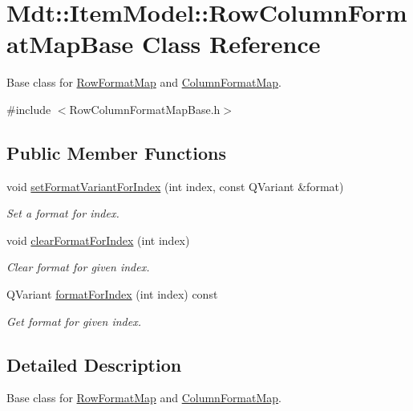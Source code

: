 \hypertarget{class_mdt_1_1_item_model_1_1_row_column_format_map_base}{}\section{Mdt\+:\+:Item\+Model\+:\+:Row\+Column\+Format\+Map\+Base Class Reference}
\label{class_mdt_1_1_item_model_1_1_row_column_format_map_base}


Base class for \hyperlink{class_mdt_1_1_item_model_1_1_row_format_map}{Row\+Format\+Map} and \hyperlink{class_mdt_1_1_item_model_1_1_column_format_map}{Column\+Format\+Map}.  




{\ttfamily \#include $<$Row\+Column\+Format\+Map\+Base.\+h$>$}

\subsection*{Public Member Functions}
\begin{DoxyCompactItemize}
\item 
void \hyperlink{class_mdt_1_1_item_model_1_1_row_column_format_map_base_ac142b0dd2a6a6caeca3ba8ffe990ebc8}{set\+Format\+Variant\+For\+Index} (int index, const Q\+Variant \&format)
\begin{DoxyCompactList}\small\item\em Set a format for index. \end{DoxyCompactList}\item 
void \hyperlink{class_mdt_1_1_item_model_1_1_row_column_format_map_base_aa4854609aa7f1c973b3b5100f3443116}{clear\+Format\+For\+Index} (int index)
\begin{DoxyCompactList}\small\item\em Clear format for given index. \end{DoxyCompactList}\item 
Q\+Variant \hyperlink{class_mdt_1_1_item_model_1_1_row_column_format_map_base_a313174f780969d8d56d7b7633f68bb5a}{format\+For\+Index} (int index) const 
\begin{DoxyCompactList}\small\item\em Get format for given index. \end{DoxyCompactList}\end{DoxyCompactItemize}


\subsection{Detailed Description}
Base class for \hyperlink{class_mdt_1_1_item_model_1_1_row_format_map}{Row\+Format\+Map} and \hyperlink{class_mdt_1_1_item_model_1_1_column_format_map}{Column\+Format\+Map}. 

